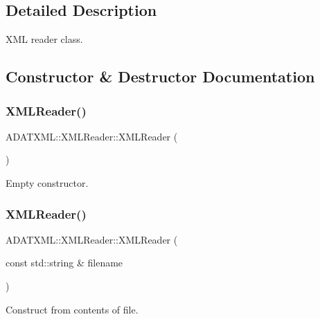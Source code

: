 \subsection{Detailed Description}
X\+ML reader class. 

\subsection{Constructor \& Destructor Documentation}
\mbox{\label{classADATXML_1_1XMLReader_a1934189445871612ae9b93f35e17c468}} 
\subsubsection{\texorpdfstring{XMLReader()}{XMLReader()}\hspace{0.1cm}{\footnotesize\ttfamily [1/10]}}
{\footnotesize\ttfamily A\+D\+A\+T\+X\+M\+L\+::\+X\+M\+L\+Reader\+::\+X\+M\+L\+Reader (\begin{DoxyParamCaption}{ }\end{DoxyParamCaption})\hspace{0.3cm}{\ttfamily [inline]}}



Empty constructor. 

\mbox{\label{classADATXML_1_1XMLReader_a85d8af8a27febdd66251e20bd96ccc32}} 
\subsubsection{\texorpdfstring{XMLReader()}{XMLReader()}\hspace{0.1cm}{\footnotesize\ttfamily [2/10]}}
{\footnotesize\ttfamily A\+D\+A\+T\+X\+M\+L\+::\+X\+M\+L\+Reader\+::\+X\+M\+L\+Reader (\begin{DoxyParamCaption}\item[{const std\+::string \&}]{filename }\end{DoxyParamCaption})\hspace{0.3cm}{\ttfamily [inline]}}



Construct from contents of file. 

